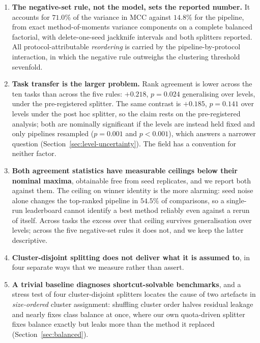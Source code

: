 \documentclass[11pt,a4paper]{article}
\begin{document}
\begin{enumerate}[leftmargin=1.4em,itemsep=2pt]
\item \textbf{The negative-set rule, not the model, sets the reported number.} It accounts
  for $71.0\%$ of the variance in MCC against $14.8\%$ for the pipeline, from exact
  method-of-moments variance components on a complete balanced factorial, with
  delete-one-seed jackknife intervals and both splitters reported. All
  protocol-attributable \emph{reordering} is carried by the pipeline-by-protocol
  interaction, in which the negative rule outweighs the clustering threshold sevenfold.
\item \textbf{Task transfer is the larger problem.} Rank agreement is lower across the ten
  tasks than across the five rules: ${+}0.218$, $p = 0.024$ generalising over levels, under
  the pre-registered splitter. The same contrast is ${+}0.185$, $p = 0.141$ over levels
  under the post hoc splitter, so the claim rests on the pre-registered analysis; both are
  nominally significant if the levels are instead held fixed and only pipelines resampled
  ($p = 0.001$ and $p < 0.001$), which answers a narrower question
  (Section~\ref{sec:level-uncertainty}). The field has a convention for neither factor.
\item \textbf{Both agreement statistics have measurable ceilings below their nominal
  maxima}, obtainable free from seed replicates, and we report both against them. The
  ceiling on winner identity is the more alarming: seed noise alone changes the top-ranked
  pipeline in $54.5\%$ of comparisons, so a single-run leaderboard cannot identify a best
  method reliably even against a rerun of itself. Across tasks the excess over that
  ceiling survives generalisation over levels; across the five negative-set rules it does
  not, and we keep the latter descriptive.
\item \textbf{Cluster-disjoint splitting does not deliver what it is assumed to}, in four
  separate ways that we measure rather than assert.
\item \textbf{A trivial baseline diagnoses shortcut-solvable benchmarks}, and a stress test
  of four cluster-disjoint splitters locates the cause of two artefacts in \emph{size-ordered}
  cluster assignment: shuffling cluster order halves residual leakage and nearly fixes class
  balance at once, where our own quota-driven splitter fixes balance exactly but leaks more
  than the method it replaced (Section~\ref{sec:balanced}).
\end{enumerate}
\end{document}
